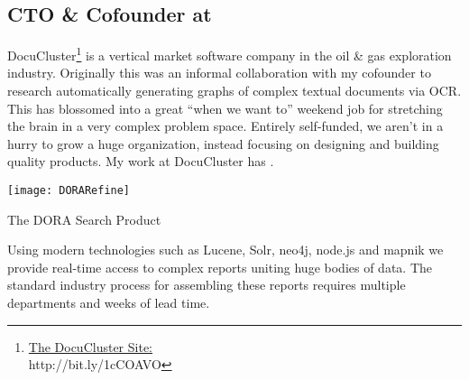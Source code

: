 \subsection{\textbf{CTO \& Cofounder} at  \shyears{[2011-PRESENT]}}
DocuCluster\footnote{\href{http://www.docucluster.com/}{The DocuCluster Site:}\\http://bit.ly/1cCOAVO} is a vertical market software company in the oil \& gas exploration industry.  Originally this was an informal collaboration with my cofounder to research automatically generating graphs of complex textual documents via OCR.  This has blossomed into a great ``when we want to'' weekend job for stretching the brain in a very complex problem space.  Entirely self-funded, we aren't in a hurry to grow a huge organization, instead focusing on designing and building quality products.  My work at DocuCluster has .
\begin{marginfigure}%
  \texttt{[image: DORARefine]}
  \caption{The DORA Search Product}
  \label{fig:DoraProduct}
\end{marginfigure}

Using modern technologies such as Lucene, Solr, neo4j, node.js and mapnik we provide real-time access to complex reports uniting huge bodies of data.  The standard industry process for assembling these reports requires multiple departments and weeks of lead time.

